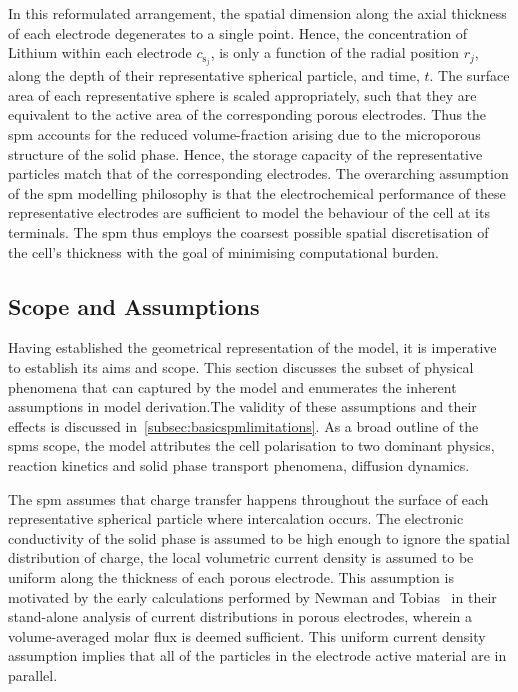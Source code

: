 In  this  reformulated  arrangement,  the  spatial  dimension  along  the  axial
thickness  of  each  electrode  degenerates   to  a  single  point.  Hence,  the
concentration of Lithium within each electrode $c_{\text{s}_j}$, \jinnegpos{} is
only a  function of the radial  position $r_j$, \jinnegpos{} along  the depth of
their representative spherical particle, and time, $t$. The surface area of each
representative sphere is scaled appropriately,  such that they are equivalent to
the  active area  of the  corresponding  porous electrodes.  Thus the  \gls{spm}
accounts  for  the  reduced  volume-fraction  arising  due  to  the  microporous
structure of the solid phase. Hence,  the storage capacity of the representative
particles match that of the corresponding electrodes. The overarching assumption
of the \gls{spm} modelling philosophy is that the electrochemical performance of
these representative  electrodes are  sufficient to model  the behaviour  of the
cell at its terminals. The \gls{spm}  thus employs the coarsest possible spatial
discretisation of the cell's thickness with the goal of minimising computational
burden.


\subsection{Scope and Assumptions}\label{subsec:basicspmassumptions}

Having established the geometrical representation of the model, it is imperative
to establish its  aims and scope. This section discusses  the subset of physical
phenomena that can captured by the model and enumerates the inherent assumptions
in  model derivation.The  validity of  these  assumptions and  their effects  is
discussed  in~\cref{subsec:basicspmlimitations}.  As  a  broad  outline  of  the
\gls{spm}s scope,  the model  attributes the cell  polarisation to  two dominant
physics, \viz{}  reaction kinetics  and solid  phase transport  phenomena, \ie{}
diffusion dynamics.


The  \gls{spm}  assumes that  charge  transfer  happens throughout  the  surface
of  each  representative  spherical  particle where  intercalation  occurs.  The
electronic  conductivity of  the solid  phase is  assumed to  be high  enough to
ignore the  spatial distribution of  charge, \ie{} the local  volumetric current
density is assumed  to be uniform along the thickness  of each porous electrode.
This assumption is  motivated by the early calculations performed  by Newman and
Tobias~\cite{Newman1962} in their stand-alone  analysis of current distributions
in porous electrodes, wherein a volume-averaged molar flux is deemed sufficient.
This uniform current density assumption implies that all of the particles in the
electrode active material are in parallel.


